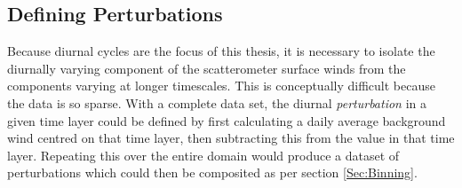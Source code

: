 \documentclass[12pt]{book}
\begin{document}
\subsection{Defining Perturbations}
\label{Sec:FormingPerturbations}
Because diurnal cycles are the focus of this thesis, it is necessary to isolate the diurnally varying component of the scatterometer surface winds from the components varying at longer timescales. This is conceptually difficult because the data is so sparse. With a complete data set, the diurnal \textit{perturbation} in a given time layer could be defined by first calculating a daily average background wind centred on that time layer, then subtracting this from the value in that time layer. Repeating this over the entire domain would produce a dataset of perturbations which could then be composited as per section \ref{Sec:Binning}.
\end{document}
